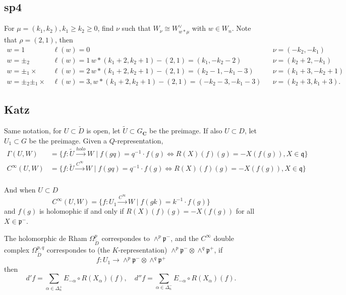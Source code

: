\documentclass[leqno]{amsart}
\newcommand{\C}{\mathbf C}
\newcommand{\1}{\mathbf{1}}
\newcommand{\cfp}{\mathfrak{p}}
\newcommand{\cfq}{\mathfrak{q}}
\theoremstyle{definition}
\theoremstyle{remark}
\begin{document}
\subsection{sp4}

For $\mu=(k_1,k_2), k_1\geq k_2\geq 0$,
find  $\nu$
such that  $W_\nu\cong W_{w*\mu}^\vee$
with $w\in W_n$.
Note that  $\rho=(2,1)$,
then 
 \begin{align*}
	 w=1\,&\ell(w)=0 & &\nu=(-k_2,-k_1)\\
	 w=\pm_2\,& \ell(w)=1\,
	 w*(k_1+2,k_2+1)-(2,1)
	 =(k_1,-k_2-2) & & \nu=(k_2+2,-k_1)\\
	 w=\pm_1\times\,& \ell(w)=2\,
	 w*(k_1+2,k_2+1)-(2,1)
	 =(k_2-1,-k_1-3) & & \nu=(k_1+3,-k_2+1)\\
	 w=\pm_2\pm_1\times\, & \ell(w)=3,
	 w*(k_1+2,k_2+1)-(2,1)
	 =(-k_2-3,-k_1-3) & & \nu=(k_2+3,k_1+3).
\end{align*}

\subsection{Katz}

Same notation,
for $U\subset \check{D}$ is open,
let $ \tilde{U}\subset G_\C$ be the preimage.
If also $U\subset D$,
let $ U_1\subset G$ be the preimage.
Given a $Q$-representation,
 \begin{align*}
	 \Gamma(U,W)&=
	 \{
	 f\colon \tilde{U}\xrightarrow{holo}W\mid
	 f(gq)=q^{-1}\cdot f(g)\Longleftrightarrow
	 R(X)(f)(g)=-X(f(g)), X\in \cfq
	 \}\\
	 C^\infty(U,W)&=
	 \{
	 f\colon \tilde{U}\xrightarrow{C^\infty}W\mid
	 f(gq)=q^{-1}\cdot f(g)\Longleftrightarrow
	 R(X)(f)(g)=-X(f(g)), X\in \cfq
	 \}\\
\end{align*}

And when $U\subset D$
 \[
	 C^\infty(U,W)=
	 \{
	 f\colon U_1\xrightarrow{C^\infty}W\mid
	 f(gk)=k^{-1}\cdot f(g)
	 \}
\]
and $f(g)$ is holomophic if and only if
$R(X)(f)(g)=-X(f(g))$ for all  $X\in \cfp^-$.

The holomorphic de Rham
$\Omega^p_{\check{D}}$
correspondes to $\wedge^p\cfp^-$,
and  the  $C^\infty$ double complex
$\Omega^{p,q}_{\check{D}}$ 
correspondes to (the $K$-representation)
 $\wedge^p\cfp^-\otimes\wedge^q\cfp^+$,
if
 \[
	f\colon U_1\to 
	\wedge^p\cfp^-\otimes\wedge^q\cfp^+
\]
then
\[
	d'f=\sum_{\alpha\in\Delta_n^+}
	E_{-\alpha}\circ R(X_\alpha)(f),\quad
	d''f=\sum_{\alpha\in\Delta_n^-}
	E_{-\alpha}\circ R(X_\alpha)(f).
\]
\end{document}
